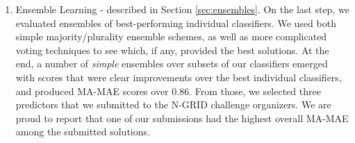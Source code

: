 \begin{enumerate}
 \item \textsf{Ensemble Learning} - described in Section \ref{sec:ensembles}. On the
 last step, we evaluated ensembles of best-performing individual classifiers. 
 We used both simple majority/plurality ensemble schemes, as well as more complicated voting
techniques to see which, if any, provided the best solutions.
At the end, a number of \textit{simple} ensembles over subsets of our classifiers emerged with scores
that were clear improvements over the best  individual classifiers, and produced \textsf{MA-MAE} scores over 0.86.  From those, we selected three predictors that we submitted
to the N-GRID  challenge organizers.  
We are proud to report that one of our submissions had the
highest overall \textsf{MA-MAE} among the submitted solutions.
\end{enumerate}

